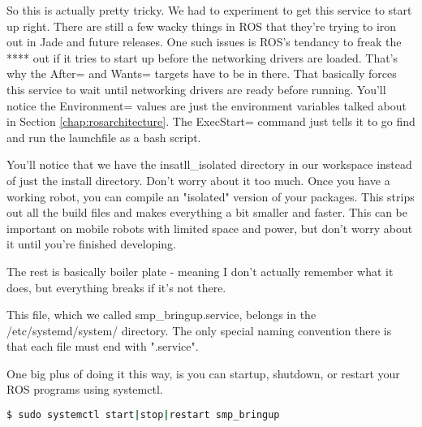 So this is actually pretty tricky. We had to experiment to get this service to start up right. There are still a few wacky things in ROS that they're trying to iron out in Jade and future releases. One such issues is ROS's tendancy to freak the **** out if it tries to start up before the networking drivers are loaded. That's why the After= and Wants= targets have to be in there. That basically forces this service to wait until networking drivers are ready before running. You'll notice the Environment= values are just the environment variables talked about in Section \ref{chap:rosarchitecture}. The ExecStart= command just tells it to go find and run the launchfile as a bash script.

You'll notice that we have the insatll\_isolated directory in our workspace instead of just the install directory. Don't worry about it too much. Once you have a working robot, you can compile an "isolated" version of your packages. This strips out all the build files and makes everything a bit smaller and faster. This can be important on mobile robots with limited space and power, but don't worry about it until you're finished developing.

The rest is basically boiler plate - meaning I don't actually remember what it does, but everything breaks if it's not there.

This file, which we called smp\_bringup.service, belongs in the /etc/systemd/system/ directory. The only special naming convention there is that each file must end with ".service".

One big plus of doing it this way, is you can startup, shutdown, or restart your ROS programs using systemctl.

\begin{lstlisting}[language=bash]
  $ sudo systemctl start|stop|restart smp_bringup
\end{lstlisting}